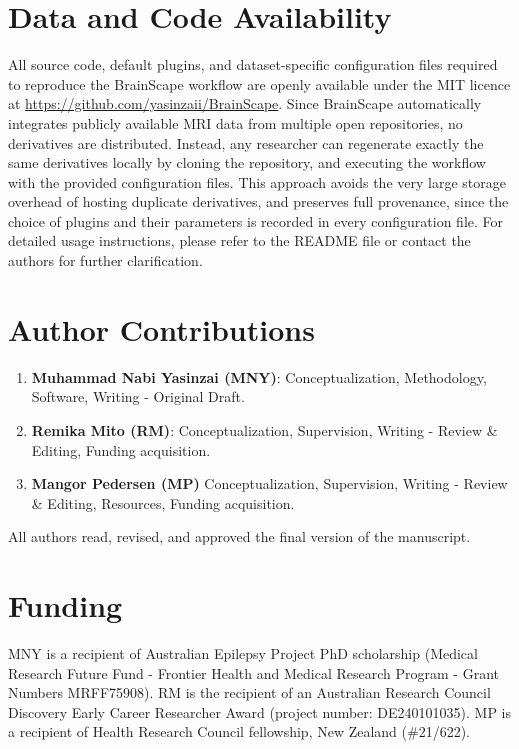 \section*{Data and Code Availability}

All source code, default plugins, and dataset-specific configuration files required 
to reproduce the BrainScape workflow are openly available under the MIT licence at 
\url{https://github.com/yasinzaii/BrainScape}. Since BrainScape automatically integrates 
publicly available MRI data from multiple open repositories, no derivatives are distributed. 
Instead, any researcher can regenerate exactly the same derivatives locally by cloning the repository, 
and executing the workflow with the provided configuration files. 
This approach avoids the very large storage overhead of hosting duplicate derivatives, 
and preserves full provenance, since the choice of plugins and their parameters is recorded 
in every configuration file. 
For detailed usage instructions, please refer to the README file or contact the authors for further clarification.



\section*{Author Contributions}

\begin{enumerate}
    \item \textbf{Muhammad Nabi Yasinzai (MNY)}: Conceptualization, Methodology, Software, Writing - Original Draft.
    \item \textbf{Remika Mito (RM)}: Conceptualization, Supervision, Writing - Review \& Editing, Funding acquisition. 
    \item \textbf{Mangor Pedersen (MP)} Conceptualization, Supervision, Writing - Review \& Editing, Resources, Funding acquisition. 
\end{enumerate}
All authors read, revised, and approved the final version of the manuscript.


\section*{Funding}

MNY is a recipient of Australian Epilepsy Project PhD scholarship 
(Medical Research Future Fund - Frontier Health and Medical Research Program - 
Grant Numbers MRFF75908). 
RM is the recipient of an Australian Research Council Discovery Early Career 
Researcher Award (project number: DE240101035). 
MP is a recipient of Health Research Council fellowship, New Zealand (\#21/622).

